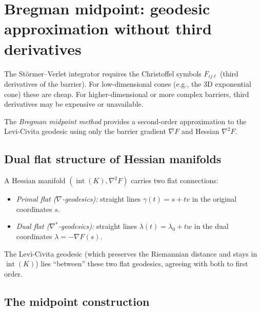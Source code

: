 \documentclass[11pt]{article}
\begin{document}
\section{Bregman midpoint: geodesic approximation without third derivatives}
\label{sec:bregman}

The St\"ormer--Verlet integrator requires the Christoffel symbols $F_{ij\ell}$
(third derivatives of the barrier).  For low-dimensional cones (e.g., the
3D exponential cone) these are cheap.  For higher-dimensional or more complex
barriers, third derivatives may be expensive or unavailable.

The \emph{Bregman midpoint method} provides a second-order approximation to the
Levi-Civita geodesic using only the barrier gradient $\nabla F$ and Hessian $\nabla^2 F$.

\subsection{Dual flat structure of Hessian manifolds}

A Hessian manifold $(\operatorname{int}(K), \nabla^2 F)$ carries two flat
connections:
\begin{itemize}
  \item \emph{Primal flat ($\nabla$-geodesics):} straight lines $\gamma(t) = s + tv$
    in the original coordinates $s$.
  \item \emph{Dual flat ($\nabla^*$-geodesics):} straight lines
    $\lambda(t) = \lambda_0 + tw$ in the dual coordinates $\lambda = -\nabla F(s)$.
\end{itemize}
The Levi-Civita geodesic (which preserves the Riemannian distance and stays in
$\operatorname{int}(K)$) lies ``between'' these two flat geodesics, agreeing with
both to first order.

\subsection{The midpoint construction}
\end{document}
